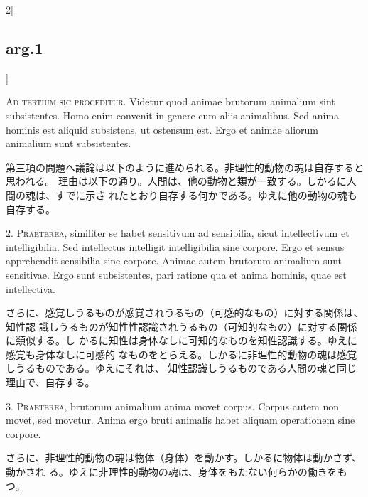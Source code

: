 \documentclass[paper=a4paper,fontsize=10pt,jafontsize=9pt,titlepage]{jlreq}
\begin{document}
\vspace{2em}
\begin{paracol}{2}[\subsection{arg.1}]

{\scshape Ad tertium sic proceditur}. Videtur quod animae brutorum animalium
sint subsistentes. Homo enim convenit in genere cum aliis animalibus. Sed anima
hominis est aliquid subsistens, ut ostensum est. Ergo et animae aliorum
animalium sunt subsistentes.

\switchcolumn

第三項の問題へ議論は以下のように進められる。非理性的動物の魂は自存すると思われる。
理由は以下の通り。人間は、他の動物と類が一致する。しかるに人間の魂は、すでに示さ
れたとおり自存する何かである。ゆえに他の動物の魂も自存する。


2. {\scshape Praeterea}, similiter se habet sensitivum ad sensibilia, sicut
intellectivum et intelligibilia. Sed intellectus intelligit intelligibilia sine
corpore. Ergo et sensus apprehendit sensibilia sine corpore. Animae autem
brutorum animalium sunt sensitivae. Ergo sunt subsistentes, pari ratione qua et
anima hominis, quae est intellectiva.

 \switchcolumn

 さらに、感覚しうるものが感覚されうるもの（可感的なもの）に対する関係は、知性認
 識しうるものが知性性認識されうるもの（可知的なもの）に対する関係に類似する。し
 かるに知性は身体なしに可知的なものを知性認識する。ゆえに感覚も身体なしに可感的
 なものをとらえる。しかるに非理性的動物の魂は感覚しうるものである。ゆえにそれは、
 知性認識しうるものである人間の魂と同じ理由で、自存する。


3. {\scshape Praeterea}, brutorum animalium anima movet corpus. Corpus autem non
movet, sed movetur. Anima ergo bruti animalis habet aliquam operationem sine
corpore.

\switchcolumn

さらに、非理性的動物の魂は物体（身体）を動かす。しかるに物体は動かさず、動かされ
る。ゆえに非理性的動物の魂は、身体をもたない何らかの働きをもつ。


\end{paracol}
\end{document}
